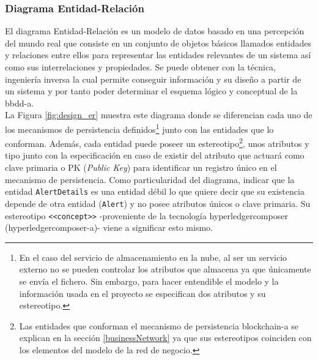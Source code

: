 \documentclass[12pt,a4paper, twoside]{report}
\begin{document}
	\subsubsection{Diagrama Entidad-Relación}
	
	El diagrama Entidad-Relación es un modelo de datos basado en una percepción del mundo real que consiste en un conjunto de objetos básicos llamados entidades y relaciones entre ellos para representar las entidades relevantes de un sistema así como sus interrelaciones y propiedades. Se puede obtener con la técnica, ingeniería inversa la cual permite conseguir información y su diseño a partir de un sistema y por tanto poder determinar el esquema lógico y conceptual de la \gls{bbdd-a}. \\
	
	La Figura \ref{fig:design_er} muestra este diagrama donde se diferencian cada uno de los mecanismos de persistencia definidos\footnote{En el caso  del servicio de almacenamiento en la nube, al ser un servicio externo no se pueden controlar los atributos que almacena ya que únicamente se envía el fichero. Sin embargo, para hacer entendible el modelo y la información usada en el proyecto se especifican dos atributos y su estereotipo.} junto con las entidades que lo conforman. Además, cada entidad puede poseer un estereotipo\footnote{Las entidades que conforman el mecanismo de persistencia \gls{blockchain-a} se explican en la sección \ref{businessNetwork} ya que sus estereotipos coinciden con los elementos del modelo de la red de negocio.}, unos atributos y tipo junto con la especificación en caso de existir del atributo que actuará como clave primaria o PK (\textit{Public Key}) para identificar un registro único en el mecanismo de persistencia. Como particularidad del diagrama, indicar que la entidad \texttt{AlertDetails} es una entidad débil lo que quiere decir que su existencia depende de otra entidad (\texttt{Alert}) y no posee atributos únicos o clave primaria. Su estereotipo \texttt{<<concept>>} -proveniente de la tecnología \gls{hyperledgercomposer} (\gls{hyperledgercomposer-a})- viene a significar esto mismo.
	
\end{document}
